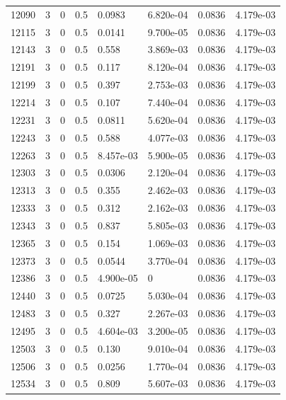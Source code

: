 \documentclass[preview]{standalone}
\begin{document}
{{{{{{{{{{{{{\begin{tabular}{L{1.2cm}C{1.2cm} C{0.3cm}C{0.5cm} C{1.4cm}C{1.4cm} C{1.4cm}C{1.4cm}}
  12090  &     3  & 0     & 0.5 &  0.0983  & 6.820e-04  & 0.0836 &  4.179e-03   \\ 
  12115  &     3  & 0     & 0.5 &  0.0141  & 9.700e-05  & 0.0836 &  4.179e-03   \\ 
  12143  &     3  & 0     & 0.5 &  0.558  & 3.869e-03  & 0.0836 &  4.179e-03   \\ 
  12191  &     3  & 0     & 0.5 &  0.117  & 8.120e-04  & 0.0836 &  4.179e-03   \\ 
  12199  &     3  & 0     & 0.5 &  0.397  & 2.753e-03  & 0.0836 &  4.179e-03   \\ 
  12214  &     3  & 0     & 0.5 &  0.107  & 7.440e-04  & 0.0836 &  4.179e-03   \\ 
  12231  &     3  & 0     & 0.5 &  0.0811  & 5.620e-04  & 0.0836 &  4.179e-03   \\ 
  12243  &     3  & 0     & 0.5 &  0.588  & 4.077e-03  & 0.0836 &  4.179e-03   \\ 
  12263  &     3  & 0     & 0.5 &  8.457e-03  & 5.900e-05  & 0.0836 &  4.179e-03   \\ 
  12303  &     3  & 0     & 0.5 &  0.0306  & 2.120e-04  & 0.0836 &  4.179e-03   \\ 
  12313  &     3  & 0     & 0.5 &  0.355  & 2.462e-03  & 0.0836 &  4.179e-03   \\ 
  12333  &     3  & 0     & 0.5 &  0.312  & 2.162e-03  & 0.0836 &  4.179e-03   \\ 
  12343  &     3  & 0     & 0.5 &  0.837  & 5.805e-03  & 0.0836 &  4.179e-03   \\ 
  12365  &     3  & 0     & 0.5 &  0.154  & 1.069e-03  & 0.0836 &  4.179e-03   \\ 
  12373  &     3  & 0     & 0.5 &  0.0544  & 3.770e-04  & 0.0836 &  4.179e-03   \\ 
  12386  &     3  & 0     & 0.5 &  4.900e-05  & 0  & 0.0836 &  4.179e-03   \\ 
  12440  &     3  & 0     & 0.5 &  0.0725  & 5.030e-04  & 0.0836 &  4.179e-03   \\ 
  12483  &     3  & 0     & 0.5 &  0.327  & 2.267e-03  & 0.0836 &  4.179e-03   \\ 
  12495  &     3  & 0     & 0.5 &  4.604e-03  & 3.200e-05  & 0.0836 &  4.179e-03   \\ 
  12503  &     3  & 0     & 0.5 &  0.130  & 9.010e-04  & 0.0836 &  4.179e-03   \\ 
  12506  &     3  & 0     & 0.5 &  0.0256  & 1.770e-04  & 0.0836 &  4.179e-03   \\ 
  12534  &     3  & 0     & 0.5 &  0.809  & 5.607e-03  & 0.0836 &  4.179e-03   \\ 

\end{tabular}}}}}}}}}}}}}}
\end{document}
